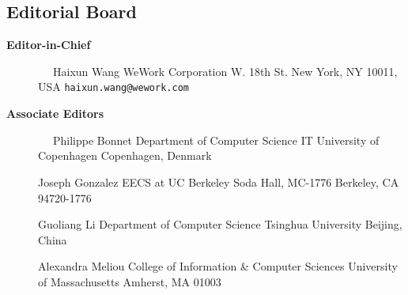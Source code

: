 \documentclass[10pt,twocolumn]{article}
\begin{document}
\pagestyle{empty}

\subsection*{Editorial Board}

\begin{description}
\item[{\bf Editor-in-Chief}]
\verb-  -                      \newline
Haixun Wang                 \newline
WeWork Corporation              W. 18th St.     \newline
New York, NY 10011, USA         \newline
\verb+haixun.wang@wework.com+     \newline
\vspace{-.2cm}

\item[{\bf Associate Editors}] 
\verb-  -                     \newline
Philippe Bonnet \newline
Department of Computer Science \newline
IT University of Copenhagen  Copenhagen, Denmark \newline

\vspace{-.4cm}
Joseph Gonzalez \newline
EECS at UC Berkeley Soda Hall, MC-1776 \newline
Berkeley, CA 94720-1776 \newline

\vspace{-.4cm}
Guoliang Li\newline
Department of Computer Science \newline 
Tsinghua University\newline
Beijing, China\newline

\vspace{-.4cm}
Alexandra Meliou\newline
College of Information \& Computer Sciences \newline 
University of  Massachusetts \newline
Amherst, MA 01003 \newline
\vspace{-.4cm}


\end{description}
\end{document}
